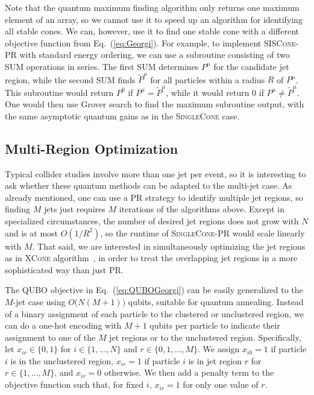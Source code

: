 \documentclass[aps,prd,twocolumn,superscriptaddress,preprintnumbers,nofootinbib,longbibliography,floatfix]{revtex4-1}
\DeclareRobustCommand{\Eq}[1]{Eq.~(\ref{#1})}
\begin{document}
Note that the quantum maximum finding algorithm only returns one maximum element of an array, so we cannot use it to speed up an algorithm for identifying all stable cones.
%
We can, however, use it to find one stable cone with a different objective function from \Eq{eq:Georgi}.
%
For example, to implement \textsc{SISCone-PR} with standard energy ordering, we can use a subroutine consisting of two SUM operations in series.
%
The first SUM determines $P^\mu$ for the candidate jet region, while the second SUM finds $\tilde{P}^\mu$ for all particles within a radius $R$ of $P^\mu$.
%
This subroutine would return $P^0$ if $P^\mu = \tilde{P}^\mu$, while it would return $0$ if $P^\mu \not= \tilde{P}^\mu$.
%
One would then use Grover search to find the maximum subroutine output, with the same asymptotic quantum gains as in the \textsc{SingleCone} case.


\subsection{Multi-Region Optimization}
\label{subsec:xcone}


Typical collider studies involve more than one jet per event, so it is interesting to ask whether these quantum methods can be adapted to the multi-jet case.
%
As already mentioned, one can use a PR strategy to identify multiple jet regions, so finding $M$ jets just requires $M$ iterations of the algorithms above.
%
Except in specialized circumstances, the number of desired jet regions does not grow with $N$ and is at most $O(1/R^2)$, so the runtime of \textsc{SingleCone-PR} would scale linearly with $M$.
%
That said, we are interested in simultaneously optimizing the jet regions as in \textsc{XCone} algorithm~\cite{Stewart:2015waa,Thaler:2015xaa}, in order to treat the overlapping jet regions in a more sophisticated way than just PR.


The QUBO objective in \Eq{eq:QUBOGeorgi} can be easily generalized to the $M$-jet case using $O\big(N(M+1)\big)$ qubits, suitable for quantum annealing.
%
Instead of a binary assignment of each particle to the clustered or unclustered region, we can do a one-hot encoding with $M+1$ qubits per particle to indicate their assignment to one of the $M$ jet regions or to the unclustered region.
%
Specifically, let $x_{ir}\in\{0,1\}$ for $i\in\{1,...,N\}$ and $r\in\{0,1,...,M\}$.
%
We assign $x_{i0}=1$ if particle $i$ is in the unclustered region, $x_{ir}=1$ if particle $i$ is in jet region $r$ for $r\in\{1,...,M\}$, and $x_{ir}=0$ otherwise.
%
We then add a penalty term to the objective function such that, for fixed $i$, $x_{ir}=1$ for only one value of $r$.
\end{document}
